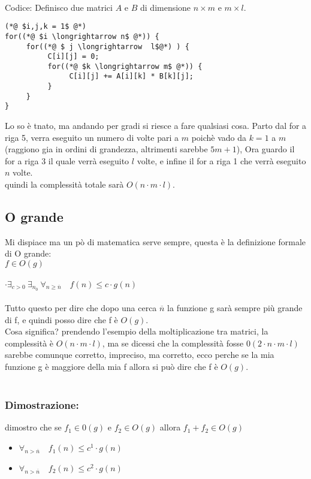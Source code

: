 \documentclass[a4paper,12pt]{article}
\begin{document}
\\
{\textcolor{codice}{Codice: }} 
Definisco due matrici $A$ e $B$ di dimensione $n \times m$ e $m \times l$. \\
\begin{lstlisting}[style=mystyle]
(*@ $i,j,k = 1$ @*)
for((*@ $i \longrightarrow n$ @*)) {
     for((*@ $ j \longrightarrow  l$@*) ) {
          C[i][j] = 0;
          for((*@ $k \longrightarrow m$ @*)) {
               C[i][j] += A[i][k] * B[k][j];
          }
     }
}
\end{lstlisting}
Lo so è tnato, ma andando per gradi si riesce a fare qualsiasi cosa. Parto dal for a riga 5, verra eseguito un numero di volte pari a $m$ poichè vado da $k=1$ a $m$ (raggiono gia in ordini di grandezza, altrimenti sarebbe $5m + 1$),
Ora guardo il for a riga 3 il quale verrà eseguito $l$ volte, e infine il for a riga 1 che verrà eseguito $n$ volte. \\
quindi la complessità totale sarà $O(n \cdot m \cdot l)$. \\


\subsection{{O grande}}
Mi dispiace ma un pò di matematica serve sempre,  questa è la definizione formale di O grande: \\
$f  \in O(g)$ \\ \\
\textbf{$\cdot \exists_{c > 0} \: \exists_{n_{0}} \: \forall_{n \ge \overline{n}} \quad f(n) \leq c \cdot g(n)$} \\
\\
Tutto questo per dire che dopo una cerca $\overline{n}$ la funzione g sarà sempre più grande di f, e quindi posso dire che f è $O(g)$.\\
Cosa significa? prendendo l'esempio della moltiplicazione tra matrici, la complessità è $O(n \cdot m \cdot l)$, ma se dicessi che la complessità fosse $0(2 \cdot n \cdot m \cdot l)$ sarebbe comunque corretto, impreciso, ma corretto,  ecco perche se la mia funzione g è maggiore della mia f allora si può dire che f è $O(g)$.
\\
\\
\subsubsection{{\textcolor{teorema}{Dimostrazione: }}}
dimostro che se $f_{1} \in 0(g)$ e $f_{2} \in O(g)$ allora $f_{1} + f_{2} \in O(g)$ 
\begin{itemize}
    \item $\forall_{n > \overline{n}} \quad f_{1}(n) \le c^{1} \cdot g(n) $
    \item $\forall_{n > \overline{n}} \quad f_{2}(n) \le c^{2} \cdot g(n) $
\end{itemize} 
\end{document}
